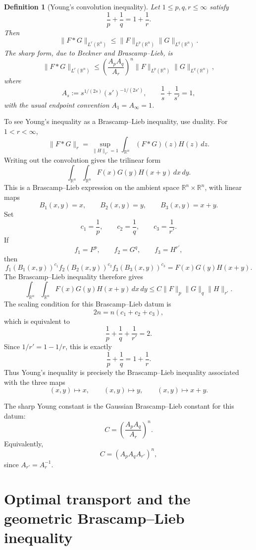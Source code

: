\documentclass[11pt]{article}
\newtheorem{definition}{Definition}
\begin{document}
\begin{definition}[Young's convolution inequality]
Let \(1\leq p,q,r\leq \infty\) satisfy
\[
        \frac1p+\frac1q = 1+\frac1r.
\]
Then
\[
        \|F*G\|_{L^r(\mathbb R^n)}
        \leq
        \|F\|_{L^p(\mathbb R^n)}
        \|G\|_{L^q(\mathbb R^n)}.
\]
The sharp form, due to Beckner and Brascamp--Lieb, is
\[
        \|F*G\|_{L^r(\mathbb R^n)}
        \leq
        \left(\frac{A_pA_q}{A_r}\right)^n
        \|F\|_{L^p(\mathbb R^n)}
        \|G\|_{L^q(\mathbb R^n)},
\]
where
\[
        A_s
        :=
        s^{1/(2s)}(s')^{-1/(2s')},
        \qquad
        \frac1s+\frac1{s'}=1,
\]
with the usual endpoint convention \(A_1=A_\infty=1\).
\end{definition}

To see Young's inequality as a Brascamp--Lieb inequality, use duality. For
\(1<r<\infty\),
\[
        \|F*G\|_r
        =
        \sup_{\|H\|_{r'}=1}
        \int_{\mathbb R^n} (F*G)(z)H(z)\,dz.
\]
Writing out the convolution gives the trilinear form
\[
        \int_{\mathbb R^n}\int_{\mathbb R^n}
        F(x)G(y)H(x+y)\,dx\,dy.
\]
This is a Brascamp--Lieb expression on the ambient space
\(\mathbb R^n\times \mathbb R^n\), with linear maps
\[
        B_1(x,y)=x,
        \qquad
        B_2(x,y)=y,
        \qquad
        B_3(x,y)=x+y.
\]
Set
\[
        c_1=\frac1p,
        \qquad
        c_2=\frac1q,
        \qquad
        c_3=\frac1{r'}.
\]
If
\[
        f_1=F^p,\qquad f_2=G^q,\qquad f_3=H^{r'},
\]
then
\[
        f_1(B_1(x,y))^{c_1}
        f_2(B_2(x,y))^{c_2}
        f_3(B_3(x,y))^{c_3}
        =
        F(x)G(y)H(x+y).
\]
The Brascamp--Lieb inequality therefore gives
\[
        \int_{\mathbb R^n}\int_{\mathbb R^n}
        F(x)G(y)H(x+y)\,dx\,dy
        \leq
        C
        \|F\|_p\|G\|_q\|H\|_{r'}.
\]
The scaling condition for this Brascamp--Lieb datum is
\[
        2n
        =
        n(c_1+c_2+c_3),
\]
which is equivalent to
\[
        \frac1p+\frac1q+\frac1{r'}=2.
\]
Since \(1/r'=1-1/r\), this is exactly
\[
        \frac1p+\frac1q=1+\frac1r.
\]
Thus Young's inequality is precisely the Brascamp--Lieb inequality associated
with the three maps
\[
        (x,y)\mapsto x,\qquad
        (x,y)\mapsto y,\qquad
        (x,y)\mapsto x+y.
\]

The sharp Young constant is the Gaussian Brascamp--Lieb constant for this datum:
\[
        C
        =
        \left(\frac{A_pA_q}{A_r}\right)^n.
\]
Equivalently,
\[
        C
        =
        \left(A_pA_qA_{r'}\right)^n,
\]
since \(A_{r'}=A_r^{-1}\).

\section{Optimal transport and the geometric Brascamp--Lieb inequality}
\end{document}
